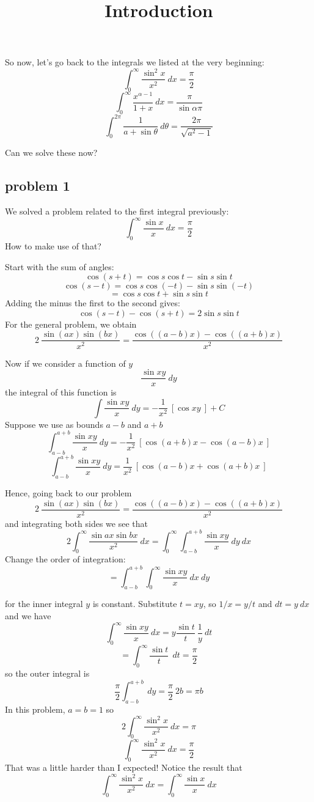 \documentclass[11pt, oneside]{article}
\title{Introduction}
\date{}
\begin{document}
\maketitle
\Large


So now, let's go back to the integrals we listed at the very beginning:
\[ \int_0^{\infty} \frac{\sin^2 x}{x^2} \ dx = \frac{\pi}{2} \]
\[ \int_0^{\infty} \frac{x^{\alpha - 1}}{1 + x} \ dx = \frac{\pi}{\sin \alpha \pi} \]
\[ \int_0^{2 \pi} \frac{1}{a + \sin \theta} \ d \theta = \frac{2 \pi}{\sqrt{a^2 - 1}} \]

Can we solve these now?  
\subsection*{problem 1}
We solved a problem related to the first integral previously:
\[ \int_0^{\infty} \frac{\sin x}{x} \ dx = \frac{\pi}{2} \]
How to make use of that?

Start with the sum of angles:
\[ \cos (s+t) = \cos s \cos t - \sin s \sin t \]
\[ \cos (s-t) = \cos s \cos (-t) - \sin s \sin (-t) \]
\[ = \cos s \cos t + \sin s \sin t \]
Adding the minus the first to the second gives:
\[ \cos (s-t) - \cos(s+t) = 2 \sin s \sin t \]
For the general problem, we obtain
\[ 2 \ \frac{\sin(ax) \sin(bx)}{x^2} =  \frac{\cos ((a-b)x) - \cos((a+b)x) }{x^2}  \]

Now if we consider a function of $y$
\[ \frac{\sin x y}{x} \ dy \]
the integral of this function is
\[ \int \frac{\sin x y}{x} \ dy = -\frac{1}{x^2} \ [ \cos x y \ ] + C \]
Suppose we use as bounds $a-b$ and $a+b$
\[ \int_{a-b}^{a+b} \frac{\sin x y}{x} \ dy = -\frac{1}{x^2} \ [ \cos (a+b) x  - \cos(a-b) x \ ] \]
\[  \int_{a-b}^{a+b} \frac{\sin x y}{x} \ dy = \frac{1}{x^2} \ [ \cos (a-b) x  + \cos(a+b) x \ ] \]

Hence, going back to our problem
\[ 2 \ \frac{\sin(ax) \sin(bx)}{x^2} =  \frac{\cos ((a-b)x) - \cos((a+b)x) }{x^2}  \]
and integrating both sides we see that
\[ 2 \int_0^{\infty} \frac{\sin ax \sin bx}{x^2} \ dx = \int_0^{\infty} \int_{a-b}^{a+b} \frac{\sin x y}{x} \ dy  \ dx \]
Change the order of integration:
\[ = \int_{a-b}^{a+b} \int_0^{\infty} \frac{\sin x y}{x} \ dx  \ dy \]

for the inner integral $y$ is constant.  Substitute $t = xy$, so $1/x = y/t$ and $dt = y \ dx$ and we have
\[ \int_0^{\infty} \frac{\sin x y}{x} \ dx = y \frac{\sin t}{t} \ \frac{1}{y} \ dt \]
\[ = \int_0^{\infty}  \frac{\sin t}{t} \ \ dt = \frac{\pi}{2} \]
so the outer integral is
\[ \frac{\pi}{2} \int_{a-b}^{a+b}  \ dy = \frac{\pi}{2} \ 2b = \pi b \]
In this problem, $a = b = 1$ so
\[ 2 \int_0^{\infty} \frac{\sin^2 x}{x^2} \ dx = \pi \]
\[ \int_0^{\infty} \frac{\sin^2 x}{x^2} \ dx = \frac{\pi}{2} \]
That was a little harder than I expected!  Notice the result that
\[ \int_0^{\infty} \frac{\sin^2 x}{x^2} \ dx = \int_0^{\infty} \frac{\sin x}{x} \ dx  \]
\end{document}
